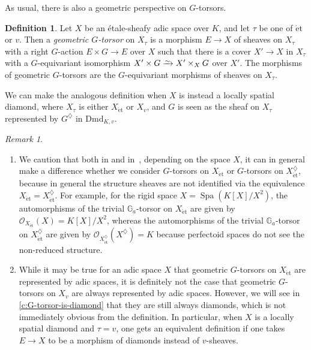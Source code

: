 \documentclass[11pt]{amsart}
\numberwithin{equation}{section}
\theoremstyle{definition}
\newtheorem{Definition}[thm]{Definition}
\theoremstyle{remark}
\newtheorem{Remark}[thm]{Remark}
\newcommand*{\lowsim}{\vbox to 0pt{\vss\hbox{$\scriptstyle\sim$}\vskip-2pt}}
\newcommand*{\isomarrow}{\xrightarrow{\lowsim}}
\newcommand{\G}{\mathbb{G}}
\renewcommand{\O}{\mathcal{O}}
\newcommand{\Spa}{\operatorname{Spa}}
\newcommand{\et}{{\operatorname{\acute{e}t}}}
\newcommand{\Dmd}{\mathrm{Dmd}}
\begin{document}
As usual, there is also a geometric perspective on $G$-torsors. 

\begin{Definition}\label{d:geom-G-torsor} Let $X$ be an \'etale-sheafy adic space over $K$, and let $\tau$ be one of $\et$ or $v$.
	Then a \emph{geometric $G$-torsor} on $X_{\tau}$ is a morphism $E\to X$ of sheaves on $X_\tau$ with a right $G$-action $E\times G\to E$ over $X$ such that there is a cover $X'\to X$ in $X_\tau$ with a $G$-equivariant isomorphism $X'\times G\isomarrow X'\times_XG$ over $X'$. The morphisms of geometric $G$-torsors are the $G$-equivariant morphisms of sheaves on $X_\tau$.
	
	We can make the analogous definition when $X$ is instead a locally spatial diamond, where $X_\tau$ is either $X_\et$ or $X_v$, and $G$ is seen as the sheaf on $X_\tau$ represented by $G^\diamondsuit$ in $\Dmd_{K,v}$.
\end{Definition}

\begin{Remark}\leavevmode
	\begin{enumerate}
		\item We caution that both in  and in~, depending on the space $X$, it can in general make a difference whether we consider $G$-torsors on $X_\et$ or $G$-torsors on $X^\diamondsuit_{\et}$, because in general the structure sheaves are not identified via the equivalence $X_\et=X^\diamondsuit_{\et}$. For example, for the rigid space $X=\Spa(K[X]/X^2)$, the automorphisms of the trivial $\G_a$-torsor on $X_\et$ are given by $\O_{X_\et}(X)=K[X]/X^2$, whereas the automorphisms of the trivial $\G_a$-torsor on $X^\diamondsuit_\et$ are given by $\O_{X^\diamondsuit_\et}(X^\diamondsuit)=K$ because perfectoid spaces do not see the non-reduced structure.
		
	\item While it may be true for an adic space $X$ that geometric $G$-torsors on $X_{\et}$ are represented by adic spaces, it is definitely not the case that  geometric $G$-torsors on $X_{v}$ are always represented by adic spaces. However, we will see in \cref{c:G-torsor-is-diamond} that they are still always diamonds, which is not immediately obvious from the definition. In particular, when $X$ is a locally spatial diamond and $\tau=v$, one gets an equivalent definition if one takes $E\to X$ to be a morphism of diamonds instead of $v$-sheaves.
	\end{enumerate}
\end{Remark}
\end{document}
